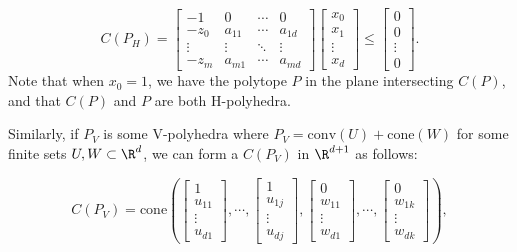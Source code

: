 \documentclass{TC}
\begin{document}
\begin{equation} \label{H-homogenization_map}
C(P_H) =  \begin{bmatrix}
-1 & 0 & \cdots & 0 \\
-z_0 & a_{11} & \cdots & a_{1d} \\
\vdots & \vdots & \ddots & \vdots \\
-z_m & a_{m1} & \cdots & a_{md}
\end{bmatrix} \begin{bmatrix}
x_0 \\ x_1 \\ \vdots \\ x_d
\end{bmatrix} \leq \begin{bmatrix}
0 \\ 0 \\ \vdots \\0
\end{bmatrix}.
\end{equation}
Note that when $x_0 = 1$, we have the polytope $P$ in the plane intersecting $C(P)$, and that $C(P)$ and $P$ are both H-polyhedra.

Similarly, if $P_V$ is some V-polyhedra where $P_V = \mathrm{conv}(U) + \mathrm{cone}(W)$ for some finite sets $U,W \subset \R^d$, we can form a $C(P_V)$ in $\R^{d+1}$ as follows: 

\begin{equation}\label{V-homogenization_map}
C(P_V) = \mathrm{cone}\left(\begin{bmatrix}
1 \\ u_{11} \\ \vdots \\ u_{d1}
\end{bmatrix}, \cdots , 
\begin{bmatrix}
1 \\ u_{1j} \\ \vdots \\ u_{dj}
\end{bmatrix} , \begin{bmatrix}
0 \\ w_{11} \\ \vdots \\ w_{d1}
\end{bmatrix}, \cdots , 
\begin{bmatrix}
0 \\ w_{1k} \\ \vdots \\ w_{dk}
\end{bmatrix}\right),
\end{equation}
\end{document}
